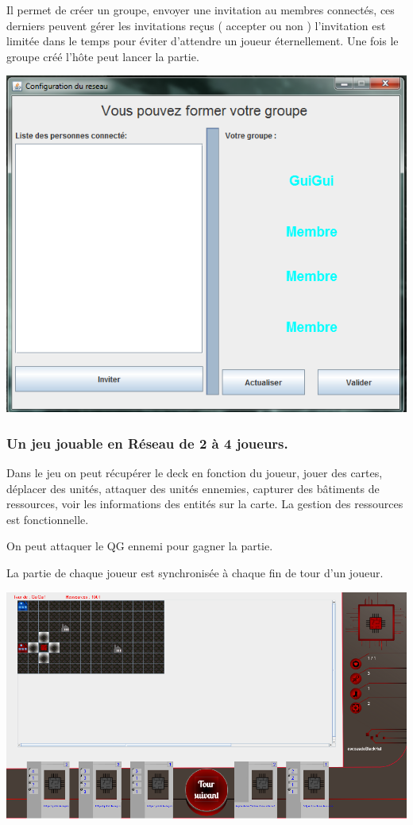 \documentclass[a4paper,11pt]{report}
\begin{document}
        Il permet de créer un groupe, envoyer une invitation au membres connectés, ces derniers peuvent gérer les invitations reçus ( accepter ou non ) l'invitation est limitée dans le temps pour éviter d'attendre un joueur éternellement. Une fois le groupe créé l'hôte peut lancer la partie.   


        \begin{center}
        \includegraphics[scale=0.5]{Assets/connection3.png} 
        \end{center}

        \subsubsection{Un jeu jouable en Réseau de 2 à 4 joueurs.}

        Dans le jeu on peut récupérer le deck en fonction du joueur, jouer des cartes, déplacer des unités, attaquer des unités ennemies, capturer des bâtiments de ressources, voir les informations des entités sur la carte. La gestion des ressources est fonctionnelle.

         On peut attaquer le QG ennemi pour gagner la partie.

        La partie de chaque joueur est synchronisée à chaque fin de tour d'un joueur.
        \begin{center}
        \includegraphics[scale=0.3]{Assets/UniteeSelectMove.png} 
        \end{center}
\end{document}
